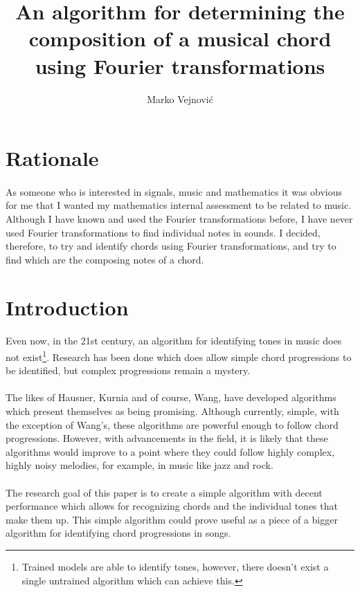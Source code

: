 \documentclass{article}
\title{An algorithm for determining the composition of a musical chord using 
	Fourier transformations}
\author{Marko Vejnovi\'{c}}
\begin{document}
\maketitle

\section{Rationale}
\paragraph*{}
As someone who is interested in signals, music and mathematics it was obvious 
for me that I wanted my mathematics internal assessment to be related to 
music. Although I have known and used the Fourier transformations before, I 
have never used Fourier transformations to find individual notes in sounds. I 
decided, therefore, to try and identify chords using Fourier transformations, 
and try to find which are the composing notes of a chord.

\section{Introduction}

\paragraph*{}
Even now, in the 21st century, an algorithm for identifying tones in music 
does not exist\footnote{Trained models are able to identify tones, however, 
there doesn't exist a single untrained algorithm which can achieve this.}. 
Research has been done which does allow simple chord progressions to be 
identified, but complex progressions remain a mystery.

\paragraph*{}
The likes of Hausner, Kurnia and of course, Wang, have developed algorithms 
which present themselves as being promising. Although currently, simple, with 
the exception of Wang's, these algorithms are powerful enough to follow chord 
progressions. However, with advancements in the field, it is likely that these 
algorithms would improve to a point where they could follow highly complex, 
highly noisy melodies, for example, in music like jazz and rock.

\paragraph*{}
The research goal of this paper is to create a simple algorithm with decent 
performance which allows for recognizing chords and the individual tones that 
make them up. This simple algorithm could prove useful as a piece of a bigger 
algorithm for identifying chord progressions in songs.
\end{document}
